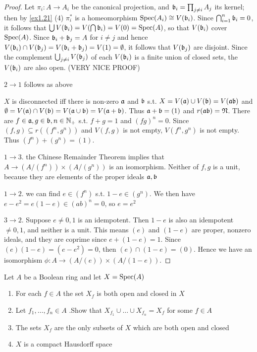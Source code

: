 \documentclass[11pt]{article}
\begin{document}
\begin{proof}
Let \(\pi_i:A\to A_i\) be the canonical projection, and \(\mathfrak{b}_i=\prod_{j\neq i}A_j\) its kernel; then by
\ref{ex1.21} (4) \(\pi^*_i\) is a homeomorphism \(\operatorname{Spec}(A_i)\cong V(\mathfrak{b}_i)\). Since \(\bigcap_{i=1}^n\mathfrak{b}_i=0\), it
follows that \(\bigcup V(\mathfrak{b}_i)=V(\bigcap\mathfrak{b}_i)=V(0)=\operatorname{Spec}(A)\), so that \(V(\mathfrak{b}_i)\) cover \(\operatorname{Spec}(A)\).
Since \(\mathfrak{b}_i+\mathfrak{b}_j=A\) for \(i\neq j\) and hence \(V(\mathfrak{b}_i)\cap V(\mathfrak{b}_j)=V(\mathfrak{b}_i+\mathfrak{b}_j)=V(1)=\emptyset\), it follows
that \(V(\mathfrak{b}_j)\) are disjoint. Since the complement \(\bigcup_{j\neq i}V(\mathfrak{b}_j)\) of each \(V(\mathfrak{b}_i)\) is a
finite union of closed sets, the \(V(\mathfrak{b}_i)\) are also open. (VERY NICE PROOF)

\(2\to 1\) follows as above

\(X\) is disconnected iff there is non-zero \(\mathfrak{a}\) and \(\mathfrak{b}\)
s.t. \(X=V(\mathfrak{a})\cup V(\mathfrak{b})=V(\mathfrak{a}\mathfrak{b})\) and \(\emptyset=V(\mathfrak{a})\cap V(\mathfrak{b})=V(\mathfrak{a}\cup\mathfrak{b})=V(\mathfrak{a}+\mathfrak{b})\). Thus \(\mathfrak{a}+\mathfrak{b}=(1)\)
and \(r(\mathfrak{a}\mathfrak{b})=\mathfrak{N}\). There are \(f\in\mathfrak{a},g\in\mathfrak{b},n\in\mathbb{N}_+\) s.t. \(f+g=1\) and \((fg)^n=0\).
Since \((f,g)\subseteq r((f^n,g^n))\) and \(V(f,g)\) is not empty, \(V(f^n,g^n)\) is not empty.
Thus \((f^n)+(g^n)=(1)\).

\(1\to 3\). the Chinese Remainder Theorem implies that \(A\to (A/(f^n))\times (A/(g^n))\)
is an isomorphism. Neither of \(f,g\) is a unit, because they are elements of the proper
ideals \(\mathfrak{a},\mathfrak{b}\)

\(1\to 2\). we can find  \(e\in(f^n)\) s.t. \(1-e\in(g^n)\). We then have \(e-e^2=e(1-e)\in(ab)^n=0\),
so \(e=e^2\)

\(3\to 2\). Suppose \(e\neq 0,1\) is an idempotent. Then \(1-e\) is also an idempotent \(\neq 0,1\), and
neither is a unit. This means \((e)\) and \((1-e)\) are proper, nonzero ideals, and they are
coprime since \(e+(1-e)=1\). Since \((e)(1-e)=(e-e^2)=0\), then \((e)\cap(1-e)=(0)\). Hence we have
an isomorphism \(\phi:A\to (A/(e))\times(A/(1-e))\).
\end{proof}

\begin{exercise}
\label{ex1.23}
Let \(A\) be a Boolean ring and let \(X=\operatorname{Spec}(A)\)
\begin{enumerate}
\item For each \(f\in A\) the set \(X_f\) is both open and closed in \(X\)
\item Let \(f_1,\dots,f_n\in A\) .Show that \(X_{f_1}\cup\dots\cup X_{f_n}=X_f\) for some \(f\in A\)
\item The sets \(X_f\) are the only subsets of \(X\) which are both open and closed
\item \(X\) is a compact Hausdorff space
\end{enumerate}
\end{exercise}
\end{document}
